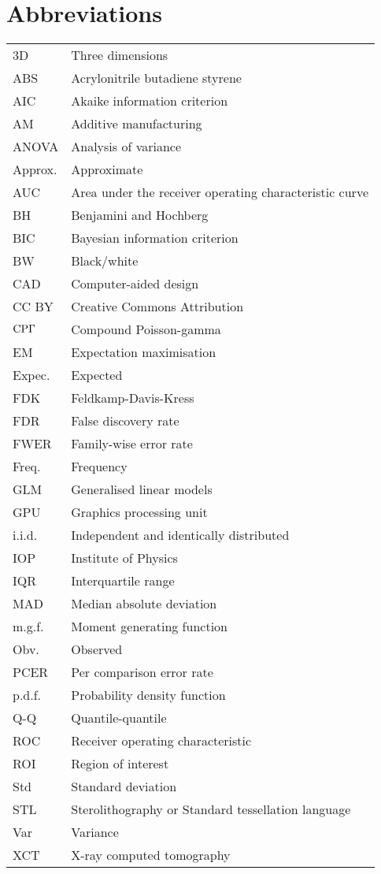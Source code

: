 \chapter{Abbreviations}

\begin{longtable}{ll}
3D&Three dimensions\\
ABS&Acrylonitrile butadiene styrene\\
AIC&Akaike information criterion\\
AM&Additive manufacturing\\
ANOVA&Analysis of variance\\
Approx.&Approximate\\
AUC&Area under the receiver operating characteristic curve\\
BH&Benjamini and Hochberg\\
BIC&Bayesian information criterion\\
BW&Black/white\\
CAD&Computer-aided design\\
CC BY&Creative Commons Attribution\\
$\operatorname{CP\Gamma}$&Compound Poisson-gamma\\
EM&Expectation maximisation\\
Expec.&Expected\\
FDK&Feldkamp-Davis-Kress\\
FDR&False discovery rate\\
FWER&Family-wise error rate\\
Freq.&Frequency\\
GLM&Generalised linear models\\
GPU&Graphics processing unit\\
i.i.d.&Independent and identically distributed\\
IOP&Institute of Physics\\
IQR&Interquartile range\\
MAD&Median absolute deviation\\
m.g.f.&Moment generating function\\
Obv.&Observed\\
PCER&Per comparison error rate\\
p.d.f.&Probability density function\\
Q-Q&Quantile-quantile\\
ROC&Receiver operating characteristic\\
ROI&Region of interest\\
Std&Standard deviation\\
STL&Sterolithography or Standard tessellation language\\
Var&Variance\\
XCT&X-ray computed tomography
\end{longtable}


